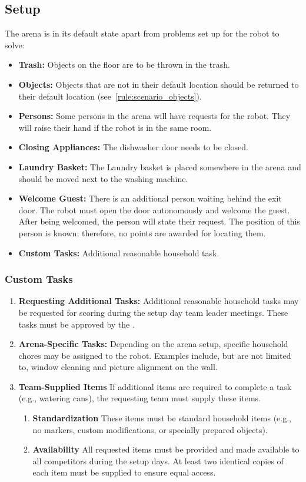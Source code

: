 \subsection*{Setup}
The arena is in its default state apart from problems set up for the robot to solve:
\begin{itemize}
  \item \textbf{Trash:} Objects on the floor are to be thrown in the trash.
  \item \textbf{Objects:} Objects that are not in their default location should be returned to their default location (see~\ref{rule:scenario_objects}). 
  \item \textbf{Persons:} Some persons in the arena will have requests for the robot. They will raise their hand if the robot is in the same room.
  \item \textbf{Closing Appliances:} The dishwasher door needs to be closed.
  \item \textbf{Laundry Basket:} The Laundry basket is placed somewhere in the arena and should be moved next to the washing machine.
  \item \textbf{Welcome Guest:} There is an additional person waiting behind the exit door. The robot must open the door autonomously and welcome the guest. After being welcomed, the person will state their request. The position of this person is known; therefore, no points are awarded for locating them.
  \item \textbf{Custom Tasks:} Additional reasonable household task.
\end{itemize}


\subsubsection{Custom Tasks}
\begin{enumerate}[nosep]
  \item \textbf{Requesting Additional Tasks:} Additional reasonable household tasks may be requested for scoring during the setup day team leader meetings. These tasks must be approved by the \TC{}.
  \item \textbf{Arena-Specific Tasks:} Depending on the arena setup, specific household chores may be assigned to the robot. Examples include, but are not limited to, window cleaning and picture alignment on the wall.
  \item \textbf{Team-Supplied Items} If additional items are required to complete a task (e.g.,  watering cans), the requesting team must supply these items.
  \begin{enumerate}[nosep]
    \item \textbf{Standardization} These items must be standard household items (e.g., no markers, custom modifications, or specially prepared objects).
    \item \textbf{Availability} All requested items must be provided and made available to all competitors during the setup days. At least two identical copies of each item must be supplied to ensure equal access.
  \end{enumerate}
\end{enumerate}


